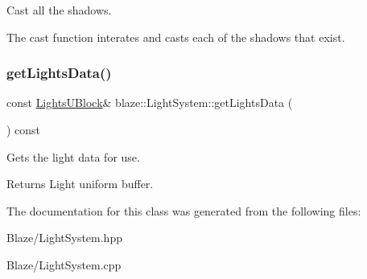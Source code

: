 Cast all the shadows. 

The cast function interates and casts each of the shadows that exist. \mbox{\label{classblaze_1_1LightSystem_a82cca79795ef7aead02b6aa48b01c6e3}} 
\subsubsection{\texorpdfstring{get\+Lights\+Data()}{getLightsData()}}
{\footnotesize\ttfamily const \hyperlink{structblaze_1_1LightsUBlock}{Lights\+U\+Block}\& blaze\+::\+Light\+System\+::get\+Lights\+Data (\begin{DoxyParamCaption}{ }\end{DoxyParamCaption}) const\hspace{0.3cm}{\ttfamily [inline]}}



Get\textquotesingle{}s the light data for use. 

\begin{DoxyReturn}{Returns}
Light uniform buffer. 
\end{DoxyReturn}


The documentation for this class was generated from the following files\+:\begin{DoxyCompactItemize}
\item 
Blaze/Light\+System.\+hpp\item 
Blaze/Light\+System.\+cpp\end{DoxyCompactItemize}
